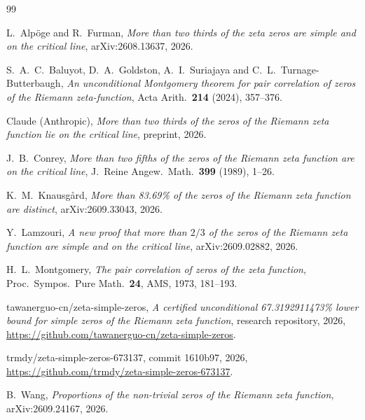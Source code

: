 \documentclass[reqno,11pt]{amsart}
\numberwithin{equation}{section}
\theoremstyle{plain}
\theoremstyle{remark}
\begin{document}
\begin{thebibliography}{99}

 L.~Alp\"oge and R.~Furman, \emph{More than two thirds of the
zeta zeros are simple and on the critical line}, arXiv:2608.13637, 2026.

 S.~A.~C.~Baluyot, D.~A.~Goldston, A.~I.~Suriajaya and
C.~L.~Turnage-Butterbaugh, \emph{An unconditional Montgomery theorem for pair
correlation of zeros of the Riemann zeta-function}, Acta Arith.\ \textbf{214}
(2024), 357--376.

 Claude (Anthropic), \emph{More than two thirds of the zeros of
the Riemann zeta function lie on the critical line}, preprint, 2026.

 J.~B.~Conrey, \emph{More than two fifths of the zeros of the
Riemann zeta function are on the critical line}, J.\ Reine Angew.\ Math.\
\textbf{399} (1989), 1--26.

 K.~M.~Knausg{\aa}rd, \emph{More than 83.69\% of the zeros of
the Riemann zeta function are distinct}, arXiv:2609.33043, 2026.

 Y.~Lamzouri, \emph{A new proof that more than $2/3$ of the
zeros of the Riemann zeta function are simple and on the critical line},
arXiv:2609.02882, 2026.

 H.~L.~Montgomery, \emph{The pair correlation of zeros of the
zeta function}, Proc.\ Sympos.\ Pure Math.\ \textbf{24}, AMS, 1973, 181--193.

 tawanerguo-cn/zeta-simple-zeros, \emph{A certified
unconditional 67.3192911473\% lower bound for simple zeros of the Riemann
zeta function}, research repository, 2026,
\url{https://github.com/tawanerguo-cn/zeta-simple-zeros}.

 trmdy/zeta-simple-zeros-673137, commit 1610b97, 2026,
\url{https://github.com/trmdy/zeta-simple-zeros-673137}.

 B.~Wang, \emph{Proportions of the non-trivial zeros of the
Riemann zeta function}, arXiv:2609.24167, 2026.

\end{thebibliography}
\end{document}
